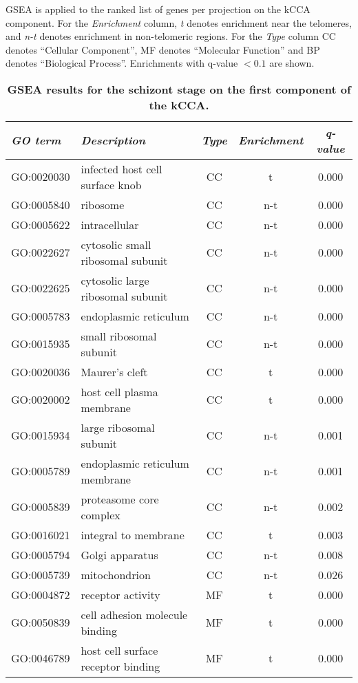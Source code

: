 \documentclass{article}
\begin{document}
\begin{table}
\caption{{\bf GSEA results for the schizont stage on the first component of the
kCCA. }}
{\normalsize GSEA is applied to the ranked list of genes per projection on the kCCA
component.
For the \emph{Enrichment} column, \emph{t} denotes enrichment near the
telomeres, and \emph{n-t} denotes enrichment in non-telomeric regions.
For the \emph{Type} column CC denotes ``Cellular Component'',
MF denotes ``Molecular Function'' and BP denotes ``Biological Process''.
Enrichments with q-value $< 0.1$ are shown.}
\vspace{10pt}
\begin{center}
\begin{tabular}{llccc}
\hline
\emph{GO term }&  \emph{Description} & \emph{Type} & \emph{Enrichment} &  \emph{q-value}  \\
\hline
GO:0020030 & infected host cell surface knob & CC & t & 0.000\\
GO:0005840 & ribosome & CC & n-t  & 0.000\\
GO:0005622 & intracellular & CC & n-t  & 0.000\\
GO:0022627 & cytosolic small ribosomal subunit & CC & n-t  & 0.000\\
GO:0022625 & cytosolic large ribosomal subunit & CC & n-t  & 0.000\\
GO:0005783 & endoplasmic reticulum & CC & n-t  & 0.000\\
GO:0015935 & small ribosomal subunit & CC & n-t  & 0.000\\
GO:0020036 & Maurer's cleft & CC & t & 0.000\\
GO:0020002 & host cell plasma membrane & CC & t & 0.000\\
GO:0015934 & large ribosomal subunit & CC & n-t  & 0.001\\
GO:0005789 & endoplasmic reticulum membrane & CC & n-t  & 0.001\\
GO:0005839 & proteasome core complex & CC & n-t  & 0.002\\
GO:0016021 & integral to membrane & CC & t & 0.003\\
GO:0005794 & Golgi apparatus & CC & n-t  & 0.008\\
GO:0005739 & mitochondrion & CC & n-t  & 0.026\\
GO:0004872 & receptor activity & MF  & t  & 0.000\\
GO:0050839 & cell adhesion molecule binding & MF  & t & 0.000\\
GO:0046789 & host cell surface receptor binding & MF  & t & 0.000\\

\end{tabular}
\end{center}
\end{table}
\end{document}

